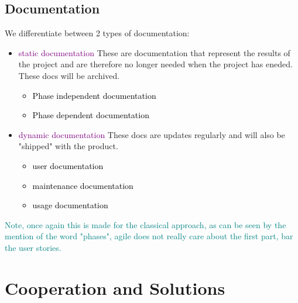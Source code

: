 \documentclass[main.tex,fontsize=12pt,paper=a4,paper=landscape,DIV=calc,]{scrartcl}
\begin{document}
\begin{multicols*}{2}
\subsection{Documentation}
We differentiate between 2 types of documentation:\newline
\begin{itemize}
\item \textcolor{purple}{static documentation}\newline
  These are documentation that represent the results of the project and are therefore no longer needed when the project has eneded.\newline
  These docs will be archived.\newline
  \begin{itemize}
  \item \textcolor{black}{Phase independent documentation}
  \item \textcolor{black}{Phase dependent documentation}
  \end{itemize} 
\item \textcolor{purple}{dynamic documentation}\newline
  These docs are updates regularly and will also be "shipped" with the product.\newline
  \begin{itemize}
  \item \textcolor{black}{user documentation}
  \item \textcolor{black}{maintenance documentation}
  \item \textcolor{black}{usage documentation}
  \end{itemize} 
\end{itemize} 
\textcolor{teal}{Note, once again this is made for the classical approach, as can be seen by the mention of the word "phases", agile does not really care about the first part, bar the user stories.}

\section{Cooperation and Solutions}


\end{multicols*}
\end{document}
